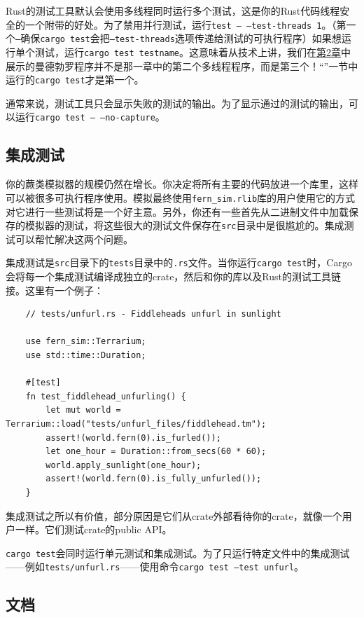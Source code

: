 Rust的测试工具默认会使用多线程同时运行多个测试，这是你的Rust代码线程安全的一个附带的好处。为了禁用并行测试，运行\texttt{test -- --test-threads 1}。（第一个\texttt{--}确保\texttt{cargo test}会把\texttt{--test-threads}选项传递给测试的可执行程序）如果想运行单个测试，运行\texttt{cargo test testname}。这意味着从技术上讲，我们在\hyperref[ch02]{第2章}中展示的曼德勃罗程序并不是那一章中的第二个多线程程序，而是第三个！“”一节中运行的\texttt{cargo test}才是第一个。

通常来说，测试工具只会显示失败的测试的输出。为了显示通过的测试的输出，可以运行\texttt{cargo test -- --no-capture}。

\subsection{集成测试}
你的蕨类模拟器的规模仍然在增长。你决定将所有主要的代码放进一个库里，这样可以被很多可执行程序使用。模拟最终使用\texttt{fern\_sim.rlib}库的用户使用它的方式对它进行一些测试将是一个好主意。另外，你还有一些首先从二进制文件中加载保存的模拟器的测试，将这些很大的测试文件保存在\texttt{src}目录中是很尴尬的。集成测试可以帮忙解决这两个问题。

集成测试是\texttt{src}目录下的\texttt{tests}目录中的\texttt{.rs}文件。当你运行\texttt{cargo test}时，Cargo会将每一个集成测试编译成独立的crate，然后和你的库以及Rust的测试工具链接。这里有一个例子：
\begin{verbatim}
    // tests/unfurl.rs - Fiddleheads unfurl in sunlight

    use fern_sim::Terrarium;
    use std::time::Duration;

    #[test]
    fn test_fiddlehead_unfurling() {
        let mut world = Terrarium::load("tests/unfurl_files/fiddlehead.tm");
        assert!(world.fern(0).is_furled());
        let one_hour = Duration::from_secs(60 * 60);
        world.apply_sunlight(one_hour);
        assert!(world.fern(0).is_fully_unfurled());
    }
\end{verbatim}

集成测试之所以有价值，部分原因是它们从crate外部看待你的crate，就像一个用户一样。它们测试crate的public API。

\texttt{cargo test}会同时运行单元测试和集成测试。为了只运行特定文件中的集成测试——例如\texttt{tests/unfurl.rs}——使用命令\texttt{cargo test --test unfurl}。

\subsection{文档}

















